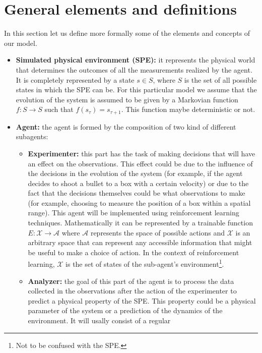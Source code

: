 \documentclass[11pt,a4paper,twoside]{report}
\newcommand{\+}{\textnormal{+} }
\theoremstyle{definition}
\numberwithin{equation}{chapter}
\begin{document}
\section{General elements and definitions}
In this section let us define more formally some of the elements and concepts of
our model.
\begin{itemize}
    \item \textbf{Simulated physical environment (SPE): } it represents the
    physical world that determines the outcomes of all the measurements realized
    by the agent. It is completely represented by a state $ s \in S $, where $S$
    is the set of all possible states in which the SPE can be. For this
    particular model we assume that the evolution of the system is assumed to be
    given by a Markovian function $f: S \rightarrow S$ such that
    $f(s_\tau)=s_{\tau+1}$. This function maybe deterministic or not.
    \item \textbf{Agent:} the agent is formed by the composition of two kind of
    different subagents:
    \begin{itemize}
        \item \textbf{Experimenter:} this part has the task of making decisions
        that will have an effect on the observations. This effect could be due
        to the influence of the decisions in the evolution of the system (for
        example, if the agent decides to shoot a bullet to a box with a certain
        velocity) or due to the fact that the decisions themselves could be what
        observations to make (for example, choosing to measure the position of a
        box within a spatial range). This agent will be implemented using
        reinforcement learning techniques. Mathematically it can be represented
        by a trainable function $E:\mathcal{X}\rightarrow\mathcal{A}$ where
        $\mathcal{A}$ represents the space of possible actions and $\mathcal{X}$
        is an arbitrary space that can represent any accessible information that
        might be useful to make a choice of action. In the context of
        reinforcement learning, $\mathcal{X}$ is the set of states of the
        sub-agent's environment\footnote{Not to be confused with the SPE.}.
        \item \textbf{Analyzer:} the goal of this part of the agent is to
        process the data collected in the observations after the action of the
        experimenter to predict a physical property of the SPE. This property
        could be a physical parameter of the system or a prediction of the
        dynamics of the environment. It will usally consist of a regular

\end{itemize}
\end{itemize}
\end{document}
